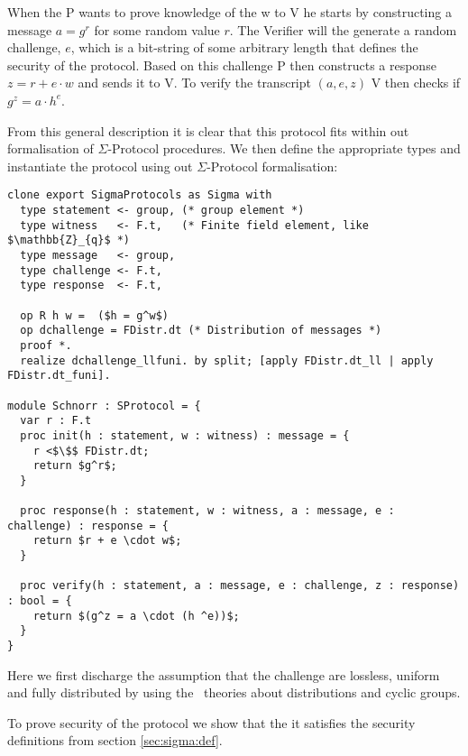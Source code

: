 When the P wants to prove knowledge of the w to V he starts by
constructing a message $a = g^{r}$ for some random value $r$. The Verifier will
the generate a random challenge, $e$, which is a bit-string of some arbitrary length
that defines the security of the protocol.
Based on this challenge P then constructs a response $z = r + e \cdot w$ and sends
it to V.
To verify the transcript $(a,e,z)$ V then checks if $g^{z} = a \cdot h^{e}$.

From this general description it is clear that this protocol fits within out
formalisation of $\Sigma$-Protocol procedures. We then define the appropriate
types and instantiate the protocol using out $\Sigma$-Protocol formalisation:

\begin{lstlisting}[mathescape,label=lst:sigma:schnorr,caption=Schnorr instantiation]
clone export SigmaProtocols as Sigma with
  type statement <- group, (* group element *)
  type witness   <- F.t,   (* Finite field element, like $\mathbb{Z}_{q}$ *)
  type message   <- group,
  type challenge <- F.t,
  type response  <- F.t,

  op R h w =  ($h = g^w$)
  op dchallenge = FDistr.dt (* Distribution of messages *)
  proof *.
  realize dchallenge_llfuni. by split; [apply FDistr.dt_ll | apply FDistr.dt_funi].

module Schnorr : SProtocol = {
  var r : F.t
  proc init(h : statement, w : witness) : message = {
    r <$\$$ FDistr.dt;
    return $g^r$;
  }

  proc response(h : statement, w : witness, a : message, e : challenge) : response = {
    return $r + e \cdot w$;
  }

  proc verify(h : statement, a : message, e : challenge, z : response) : bool = {
    return $(g^z = a \cdot (h ^e))$;
  }
}
\end{lstlisting}

Here we first discharge the assumption that the challenge are lossless, uniform
and fully distributed by using the \easycrypt\ theories about distributions and
cyclic groups.

To prove security of the protocol we show that the it satisfies the security
definitions from section \ref{sec:sigma:def}.

